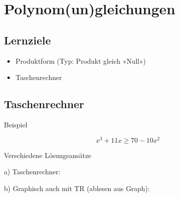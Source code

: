 
\section{Polynom(un)gleichungen}


\subsection*{Lernziele}

\begin{itemize}
\item Produktform (Typ: Produkt gleich «Null»)
\item Taschenrechner
\end{itemize}

\newpage


\newpage

\newpage

\subsection{Taschenrechner}
Beispiel

$$x^3 + 11x \ge{} 70 - 10x^2$$

Verschiedene Lösungsansätze


a) Taschenrechner: 

\leserluft{}

b) Graphisch auch mit TR (ablesen aus Graph):

